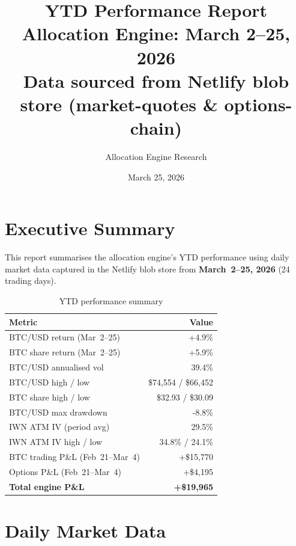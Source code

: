\documentclass[11pt,letterpaper]{article}
\title{%
  \textbf{YTD Performance Report} \\[4pt]
  \large Allocation Engine: March 2--25, 2026 \\[2pt]
  \normalsize Data sourced from Netlify blob store (market-quotes \& options-chain)
}
\author{Allocation Engine Research}
\date{March 25, 2026}
\begin{document}
\maketitle
\thispagestyle{fancy}

\section{Executive Summary}

This report summarises the allocation engine's YTD performance using
daily market data captured in the Netlify blob store from
\textbf{March~2--25, 2026} (24 trading days).

\begin{table}[H]
\centering
\caption{YTD performance summary}
\begin{tabular}{lr}
\toprule
Metric & Value \\
\midrule
BTC/USD return (Mar~2--25)   & \textcolor{gain}{+4.9\%} \\
BTC share return (Mar~2--25) & \textcolor{gain}{+5.9\%} \\
BTC/USD annualised vol       & 39.4\% \\
BTC/USD high / low           & \$74,554 / \$66,452 \\
BTC share high / low         & \$32.93 / \$30.09 \\
BTC/USD max drawdown         & \textcolor{loss}{-8.8\%} \\
\midrule
IWN ATM IV (period avg)      & 29.5\% \\
IWN ATM IV high / low        & 34.8\% / 24.1\% \\
\midrule
BTC trading P\&L (Feb~21--Mar~4) & \textcolor{gain}{+\$15,770} \\
Options P\&L (Feb~21--Mar~4) & \textcolor{gain}{+\$4,195} \\
\textbf{Total engine P\&L} & \textcolor{gain}{\textbf{+\$19,965}} \\
\bottomrule
\end{tabular}
\end{table}

\section{Daily Market Data}
\end{document}
